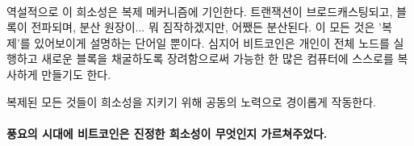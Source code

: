 \paragraph{}
역설적으로 이 희소성은 복제 메커니즘에 기인한다. 
트랜잭션이 브로드캐스팅되고, 블록이 전파되며, 분산 원장이... 뭐 짐작하겠지만, 어쨌든 분산된다.
이 모든 것은 '복제'를 있어보이게 설명하는 단어일 뿐이다.
심지어 비트코인은 개인이 전체 노드를 실행하고 새로운 블록을 채굴하도록 장려함으로써 
가능한 한 많은 컴퓨터에 스스로를 복사하게 만들기도 한다. 

복제된 모든 것들이 희소성을 지키기 위해 공동의 노력으로 경이롭게 작동한다.

\paragraph{풍요의 시대에 비트코인은 진정한 희소성이 무엇인지 가르쳐주었다.}

%
%
%
%
%
%
%

